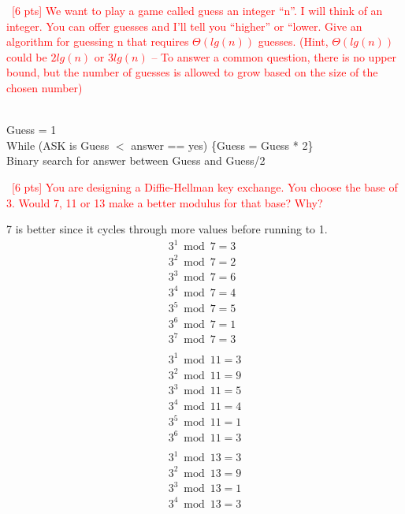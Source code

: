 \documentclass[12pt]{article}
\newenvironment{sol}[1][Solution]{\begin{trivlist}\item[\hskip\labelsep {\bfseries #1:}]}{\end{trivlist}}
\begin{document}
\begin{enumerate}
    \item \ \textcolor{red}{[6 pts] We want to play a game called guess an integer “n”. I will think of an integer. You can offer guesses and I’ll tell you “higher” or “lower. Give an algorithm for guessing n that requires $\Theta(lg(n))$ guesses. (Hint, $\Theta(lg(n))$ could be $2 lg (n)$ or $3 lg(n)$ – To answer a common question, there is no upper bound, but the number of guesses is allowed to grow based on the size of the chosen number)}
    \begin{sol}
        \hspace*{\fill}\\
        Guess = 1\\
        While (ASK is Guess $<$ answer == yes) \{Guess = Guess * 2\} \\
        Binary search for answer between Guess and Guess/2
    \end{sol}

    \item \ \textcolor{red}{[6 pts] You are designing a Diffie-Hellman key exchange. You choose the base of 3. Would 7, 11 or 13 make a better modulus for that base? Why?}
    \begin{sol}
    7 is better since it cycles through more values before running to 1.
    \begin{align*}
        3^1 \bmod 7 = 3 \\
        3^2 \bmod 7 = 2 \\ 
        3^3 \bmod 7 = 6 \\ 
        3^4 \bmod 7 = 4 \\
        3^5 \bmod 7 = 5 \\ 
        3^6 \bmod 7 = 1 \\
        3^7 \bmod 7 = 3 \\
        \\        
        3^1 \bmod 11 = 3 \\
        3^2 \bmod 11 = 9 \\ 
        3^3 \bmod 11 = 5 \\ 
        3^4 \bmod 11 = 4 \\
        3^5 \bmod 11 = 1 \\ 
        3^6 \bmod 11 = 3 \\
        \\
        3^1 \bmod 13 = 3 \\
        3^2 \bmod 13 = 9 \\ 
        3^3 \bmod 13 = 1 \\ 
        3^4 \bmod 13 = 3 \\
    \end{align*}
    \end{sol}


\end{enumerate}
\end{document}
